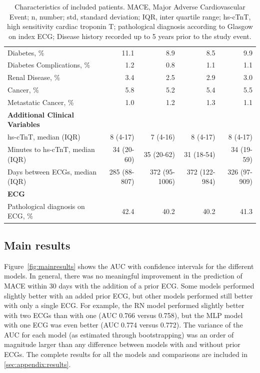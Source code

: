 \documentclass[preprint]{elsarticle}
\begin{document}
\begin{table}
\begin{footnotesize}
\begin{tabular}{@{}lrrrr@{}}
Diabetes, \%                                     & 11.1           & 8.9                 & 8.5           & 9.9            \\
Diabetes Complications, \%                       & 1.2            & 0.8                 & 1.1           & 1.1            \\
Renal Disease, \%                                & 3.4            & 2.5                 & 2.9           & 3.0            \\
Cancer, \%                                       & 5.8            & 5.2                 & 5.4           & 5.5            \\
Metastatic Cancer, \%                            & 1.0            & 1.2                 & 1.3           & 1.1            \\
\midrule
\textbf{Additional Clinical Variables} & & & & \\
\midrule
hs-cTnT, median (IQR)                            & 8 (4-17)       & 7 (4-16)            & 8 (4-17)      & 8 (4-17)       \\
Minutes to hs-cTnT, median (IQR) & 34 (20-60)     & 35 (20-62)          & 31 (18-54)    & 34 (19-59)     \\
Days between ECGs, median (IQR)                  & 285 (88-807)   & 372 (95-1006)       & 372 (122-984) & 326 (97-909)   \\
\midrule
\textbf{ECG} & & & & \\
\midrule
Pathological diagnosis on ECG, \%                & 42.4           & 40.2                & 40.2          & 41.3           \\
\bottomrule
\end{tabular}
\caption{Characteristics of included patients. MACE, Major Adverse Cardiovascular Event; n, number; std, standard deviation; IQR, inter quartile range; hs-cTnT, high sensitivity cardiac troponin T; pathological diagnosis according to Glasgow on index ECG; Disease history recorded up to 5 years prior to the study event.}
\label{table:characteristics}
  \end{footnotesize}
\end{table}
\renewcommand{\arraystretch}{1}

\subsection{Main results}
Figure~\ref{fig:mainresults} shows the AUC with confidence intervals for the different models. In general, there was no meaningful improvement in the prediction of MACE within 30 days with the addition of a prior ECG. Some models performed slightly better with an added prior ECG, but other models performed still better with only a single ECG. For example, the RN model performed slightly better with two ECGs than with one (AUC 0.766 versus 0.758), but the MLP model with one ECG was even better (AUC 0.774 versus 0.772). The variance of the AUC for each model (as estimated through bootstrapping) was an order of magnitude larger than any difference between models with and without prior ECGs. The complete results for all the models and comparisons are included in \ref{sec:appendix:results}. 
\end{document}
